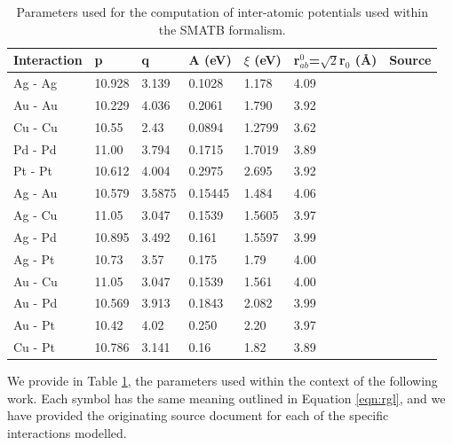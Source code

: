 \begin{table}[ht]
\centering
\caption{Parameters used for the computation of inter-atomic potentials used within the SMATB formalism.}
\label{tab:RGL}
\begin{tabular}{@{}lllllll@{}}
\toprule
Interaction & p & q & A (eV) & $\xi$ (eV)  & r$_{ab}^{0}$=$\sqrt{2}$r$_{0}$ (\AA) & Source      \\
\hline
Ag - Ag     & 10.928 & 3.139 & 0.1028 & 1.178 & 4.09 &  \cite{doi:10.1021/acs.jpcc.5b03577}  \\
Au - Au     & 10.229 & 4.036 & 0.2061 & 1.790 & 3.92 &  \cite{doi:10.1021/acs.jpcc.5b03577} \\
Cu - Cu     & 10.55 & 2.43 & 0.0894 & 1.2799 & 3.62 & \cite{CuPt}  \\
Pd - Pd     & 11.00 & 3.794 & 0.1715 & 1.7019 & 3.89 &  \cite{RGL_Pot}  \\
Pt - Pt     & 10.612 & 4.004 & 0.2975 & 2.695 & 3.92 & \cite{CuPt}  \\
%
Ag - Au     & 10.579 & 3.5875 & 0.15445 & 1.484 & 4.06 & \cite{doi:10.1021/acs.jpcc.5b03577}  \\
Ag - Cu     & 11.05 & 3.047 & 0.1539 & 1.5605 & 3.97 & \cite{PhysRevB.66.155420}   \\
Ag - Pd     & 10.895 & 3.492 & 0.161 & 1.5597 & 3.99 & \cite{doi:10.1063/1.1898223}   \\
Ag - Pt     & 10.73  & 3.57  & 0.175 & 1.79   & 4.00 & \cite{doi:10.1063/1.2897435}  \\
%
Au - Cu     & 11.05 & 3.047 & 0.1539 & 1.561 & 4.00 &  \cite{doi:10.1063/1.1898223} \\
Au - Pd     & 10.569 & 3.913 & 0.1843 & 2.082 & 3.99 & \cite{doi:10.1063/1.2897435}   \\
Au - Pt     & 10.42 & 4.02 & 0.250 & 2.20 & 3.97 &  \cite{doi:10.1098/rspa.2010.0562} \\
%
Cu - Pt     & 10.786 & 3.141 & 0.16 & 1.82 & 3.89 & \cite{CuPt}  \\
\bottomrule
\end{tabular}
\end{table}

We provide in Table \ref{tab:RGL}, the parameters used within the context of the following work. Each symbol has the same meaning outlined in Equation \ref{eqn:rgl}, and we have provided the originating source document for each of the specific interactions modelled. 


